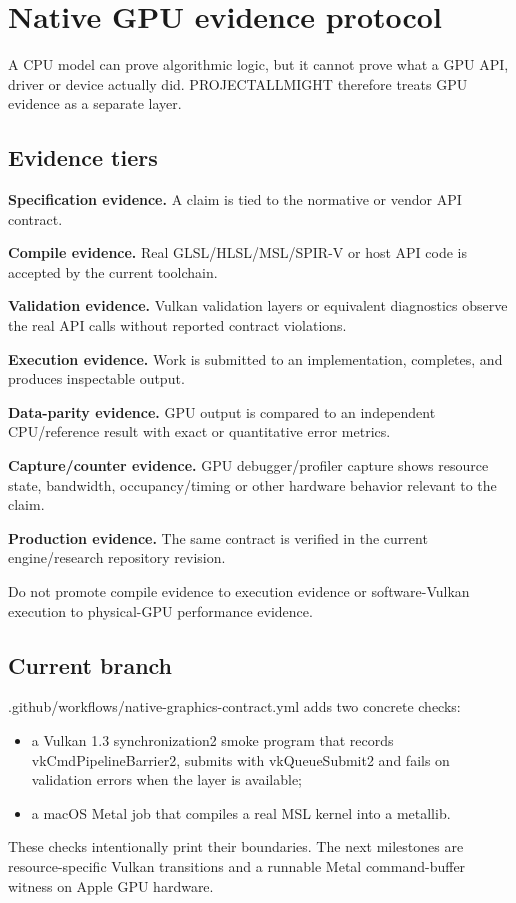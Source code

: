 \hypertarget{appendix-1680333ac796}{}
\section{Native GPU evidence protocol}\label{appendix-1680333ac796-native-gpu-evidence-protocol}

A CPU model can prove algorithmic logic, but it cannot prove what a GPU API, driver or device actually did. PROJECTALLMIGHT therefore treats GPU evidence as a separate layer.

\subsection{Evidence tiers}\label{appendix-1680333ac796-evidence-tiers}

\textbf{Specification evidence.} A claim is tied to the normative or vendor API contract.

\textbf{Compile evidence.} Real GLSL/HLSL/MSL/SPIR-V or host API code is accepted by the current toolchain.

\textbf{Validation evidence.} Vulkan validation layers or equivalent diagnostics observe the real API calls without reported contract violations.

\textbf{Execution evidence.} Work is submitted to an implementation, completes, and produces inspectable output.

\textbf{Data-parity evidence.} GPU output is compared to an independent CPU/reference result with exact or quantitative error metrics.

\textbf{Capture/counter evidence.} GPU debugger/profiler capture shows resource state, bandwidth, occupancy/timing or other hardware behavior relevant to the claim.

\textbf{Production evidence.} The same contract is verified in the current engine/research repository revision.

Do not promote compile evidence to execution evidence or software-Vulkan execution to physical-GPU performance evidence.

\subsection{Current branch}\label{appendix-1680333ac796-current-branch}

.github/workflows/native-graphics-contract.yml adds two concrete checks:

\begin{itemize}
\tightlist
\item
  a Vulkan 1.3 synchronization2 smoke program that records vkCmdPipelineBarrier2, submits with vkQueueSubmit2 and fails on validation errors when the layer is available;
\item
  a macOS Metal job that compiles a real MSL kernel into a metallib.
\end{itemize}

These checks intentionally print their boundaries. The next milestones are resource-specific Vulkan transitions and a runnable Metal command-buffer witness on Apple GPU hardware.
